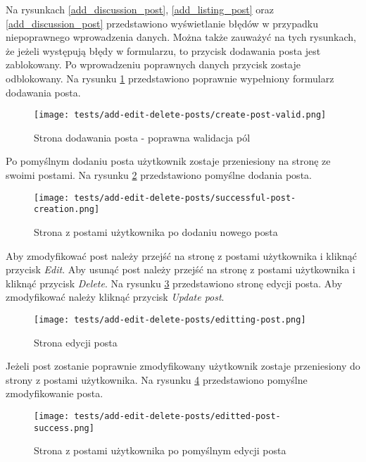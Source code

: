 Na rysunkach \ref{add_discussion_post}, \ref{add_listing_post} oraz \ref{add_discussion_post} przedstawiono wyświetlanie błędów w przypadku niepoprawnego wprowadzenia danych. Można także zauważyć na tych rysunkach, że jeżeli występują błędy w formularzu, to przycisk dodawania posta jest zablokowany. Po wprowadzeniu poprawnych danych przycisk zostaje odblokowany. Na rysunku \ref{add_valid_post} przedstawiono poprawnie wypełniony formularz dodawania posta.
\begin{figure}[H]
  \centering
  \texttt{[image: tests/add-edit-delete-posts/create-post-valid.png]}
  \caption{Strona dodawania posta - poprawna walidacja pól}
  \label{add_valid_post}
\end{figure}
Po pomyślnym dodaniu posta użytkownik zostaje przeniesiony na stronę ze swoimi postami. Na rysunku \ref{add_post_success} przedstawiono pomyślne dodania posta.
\begin{figure}[H]
  \centering
  \texttt{[image: tests/add-edit-delete-posts/successful-post-creation.png]}
  \caption{Strona z postami użytkownika po dodaniu nowego posta}
  \label{add_post_success}
\end{figure}
Aby zmodyfikować post należy przejść na stronę z postami użytkownika i kliknąć przycisk \textit{Edit}. Aby usunąć post należy przejść na stronę z postami użytkownika i kliknąć przycisk \textit{Delete}. Na rysunku \ref{edit_post} przedstawiono stronę edycji posta. Aby zmodyfikować należy kliknąć przycisk \textit{Update post}. 
\begin{figure}[H]
  \centering
  \texttt{[image: tests/add-edit-delete-posts/editting-post.png]}
  \caption{Strona edycji posta}
  \label{edit_post}
\end{figure}
Jeżeli post zostanie poprawnie zmodyfikowany użytkownik zostaje przeniesiony do strony z postami użytkownika. Na rysunku \ref{edit_post_success} przedstawiono pomyślne zmodyfikowanie posta.
\begin{figure}[H]
  \centering
  \texttt{[image: tests/add-edit-delete-posts/editted-post-success.png]}
  \caption{Strona z postami użytkownika po pomyślnym edycji posta}
  \label{edit_post_success}
\end{figure}

